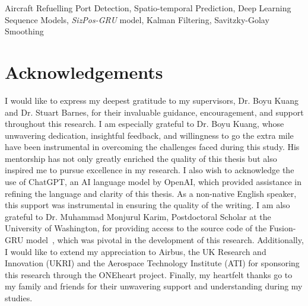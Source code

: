 \documentclass[12pt,oneside]{book} %
\begin{document}
\begin{keywords}
    Aircraft Refuelling Port Detection, Spatio-temporal Prediction, Deep Learning Sequence Models, \textit{SizPos-GRU} model, Kalman Filtering, Savitzky-Golay Smoothing
\end{keywords}

\chapter{Acknowledgements}
I would like to express my deepest gratitude to my supervisors, Dr. Boyu Kuang
and Dr. Stuart Barnes, for their invaluable guidance, encouragement, and
support throughout this research. I am especially grateful to Dr. Boyu Kuang,
whose unwavering dedication, insightful feedback, and willingness to go the
extra mile have been instrumental in overcoming the challenges faced during
this study. His mentorship has not only greatly enriched the quality of this
thesis but also inspired me to pursue excellence in my research. I also wish to
acknowledge the use of ChatGPT, an AI language model by OpenAI, which provided
assistance in refining the language and clarity of this thesis. As a non-native
English speaker, this support was instrumental in ensuring the quality of the
writing. I am also grateful to Dr. Muhammad Monjurul Karim, Postdoctoral
Scholar at the University of Washington, for providing access to the source
code of the Fusion-GRU model~\cite{FusionGRU}, which was pivotal in the
development of this research. Additionally, I would like to extend my
appreciation to Airbus, the UK Research and Innovation (UKRI) and the Aerospace
Technology Institute (ATI) for sponsoring this research through the ONEheart
project. Finally, my heartfelt thanks go to my family and friends for their
unwavering support and understanding during my studies.

    { \clearpage

        \singlespacing{
            \tableofcontents
        }
        \clearpage

        {%
            \let\oldnumberline\numberline%
            \renewcommand{\numberline}{\figurename~\oldnumberline}%
            \listoffigures%
        }

        \clearpage
        {%
            \let\oldnumberline\numberline%
            \renewcommand{\numberline}{\tablename~\oldnumberline}%
            \listoftables%
        }
    }
\end{document}
